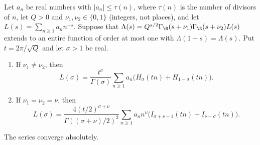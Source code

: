 \begin{lemma}\label{an:balanced-afe}
Let $a_n$ be real numbers with $|a_n|\le\tau(n)$, where $\tau(n)$ is the
number of divisors of $n$, let $Q>0$ and
$\nu_1,\nu_2\in\{0,1\}$ (integers, not places), and let
$L(s)=\sum_{n\ge1}a_nn^{-s}$. Suppose that
$\Lambda(s)=Q^{s/2}\Gamma_\R(s+\nu_1)\Gamma_\R(s+\nu_2)L(s)$ extends to an
entire function of order at most one with $\Lambda(1-s)=\Lambda(s)$. Put
$t=2\pi/\sqrt Q$ and let $\sigma>1$ be real.
\begin{enumerate}
\item If $\nu_1\ne\nu_2$, then
\[
 L(\sigma)=\frac{t^\sigma}{\Gamma(\sigma)}\sum_{n\ge1}a_n
 \bigl(H_\sigma(tn)+H_{1-\sigma}(tn)\bigr).
\]
\item If $\nu_1=\nu_2=\nu$, then
\[
 L(\sigma)=\frac{4(t/2)^{\sigma+\nu}}{\Gamma((\sigma+\nu)/2)^2}
 \sum_{n\ge1}a_nn^\nu
 \bigl(I_{\sigma+\nu-1}(tn)+I_{\nu-\sigma}(tn)\bigr).
\]
\end{enumerate}
The series converge absolutely.
\end{lemma}

